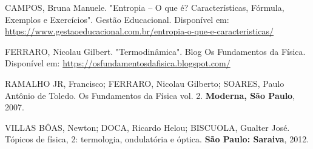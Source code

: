 \documentclass[11pt,twocolumn,oneside]{article}
\begin{document}
CAMPOS, Bruna Manuele. "Entropia – O que é? Características, Fórmula, Exemplos e Exercícios". Gestão Educacional. Disponível em: \href{https://www.gestaoeducacional.com.br/entropia-o-que-e-caracteristicas/}{https://www.gestaoeducacional.com.br/entropia-o-que-e-caracteristicas/}


FERRARO, Nicolau Gilbert. "Termodinâmica". Blog Os Fundamentos da Física. Disponível em: \href{https://osfundamentosdafisica.blogspot.com/}{https://osfundamentosdafisica.blogspot.com/}


RAMALHO JR, Francisco; FERRARO, Nicolau Gilberto; SOARES, Paulo Antônio de Toledo. Os Fundamentos da Física vol. 2. \textbf{Moderna, São Paulo}, 2007.


VILLAS BÔAS, Newton; DOCA, Ricardo Helou; BISCUOLA, Gualter José. Tópicos de física, 2: termologia, ondulatória e óptica. \textbf{São Paulo: Saraiva}, 2012.
\end{document}
